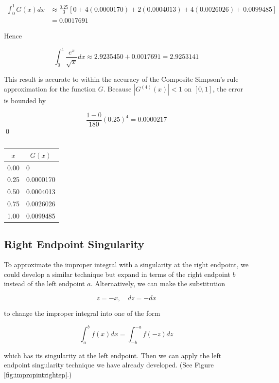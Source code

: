 \begin{mysolution}
$$
\begin{aligned}
\int_{0}^{1} G(x) d x & \approx \frac{0.25}{3}[0+4(0.0000170)+2(0.0004013)+4(0.0026026)+0.0099485] \\
& =0.0017691
\end{aligned}
$$

Hence

$$
\int_{0}^{1} \frac{e^{x}}{\sqrt{x}} d x \approx 2.9235450+0.0017691=2.9253141
$$

This result is accurate to within the accuracy of the Composite Simpson's rule approximation for the function $G$. Because $\left|G^{(4)}(x)\right|<1$ on $[0,1]$, the error is bounded by

$$
\frac{1-0}{180}(0.25)^{4}=0.0000217
$$\qed
\end{mysolution}

\begin{table}[h]
\centering
\begin{tabular}{cl}
\hline
$x$ & \multicolumn{1}{c}{$G(x)$} \\
\hline
0.00 & 0 \\
0.25 & 0.0000170 \\
0.50 & 0.0004013 \\
0.75 & 0.0026026 \\
1.00 & 0.0099485 \\
\hline
\end{tabular}
\caption{}
\label{tab:impropinteexam1}
\end{table}


\subsection*{Right Endpoint Singularity}
To approximate the improper integral with a singularity at the right endpoint, we could develop a similar technique but expand in terms of the right endpoint $b$ instead of the left endpoint $a$. Alternatively, we can make the substitution

$$
z=-x, \quad d z=-d x
$$

to change the improper integral into one of the form


\begin{equation*}
\int_{a}^{b} f(x) d x=\int_{-b}^{-a} f(-z) d z \tag{4.46}
\end{equation*}


which has its singularity at the left endpoint. Then we can apply the left endpoint singularity technique we have already developed. (See Figure \ref{fig:impropintrightep}.)

